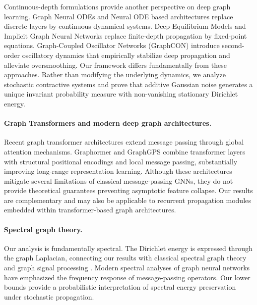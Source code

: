 \documentclass{article}
\begin{document}
Continuous-depth formulations provide another perspective on deep graph
learning.
Graph Neural ODEs
\cite{poli2019graphode}
and Neural ODE based architectures
\cite{chen2018neuralode}
replace discrete layers by continuous dynamical systems.
Deep Equilibrium Models
\cite{bai2019deep}
and Implicit Graph Neural Networks
\cite{gu2020implicit}
replace finite-depth propagation by fixed-point equations.
Graph-Coupled Oscillator Networks (GraphCON)
\cite{rusch2023graphcon}
introduce second-order oscillatory dynamics that empirically stabilize
deep propagation and alleviate oversmoothing.
Our framework differs fundamentally from these approaches.
Rather than modifying the underlying dynamics,
we analyze stochastic contractive systems and prove that additive Gaussian
noise generates a unique invariant probability measure with non-vanishing
stationary Dirichlet energy.

\paragraph{Graph Transformers and modern deep graph architectures.}

Recent graph transformer architectures extend message passing through global
attention mechanisms.
Graphormer
\cite{ying2021graphormer}
and GraphGPS
\cite{rampasek2022graphgps}
combine transformer layers with structural positional encodings and local
message passing, substantially improving long-range representation learning.
Although these architectures mitigate several limitations of classical
message-passing GNNs, they do not provide theoretical guarantees preventing
asymptotic feature collapse.
Our results are complementary and may also be applicable to recurrent
propagation modules embedded within transformer-based graph architectures.

\paragraph{Spectral graph theory.}

Our analysis is fundamentally spectral.
The Dirichlet energy is expressed through the graph Laplacian,
connecting our results with classical spectral graph theory
\cite{chung1997}
and graph signal processing
\cite{shuman2013}.
Modern spectral analyses of graph neural networks
\cite{balcilar2021analyzing}
have emphasized the frequency response of message-passing operators.
Our lower bounds provide a probabilistic interpretation of spectral
energy preservation under stochastic propagation.
\end{document}
